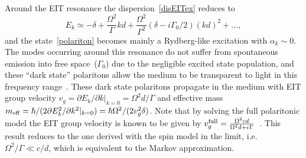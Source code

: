\documentclass[pra,twocolumn,showpacs,preprintnumbers,amsmath,amssymb]{revtex4-1}
\begin{document}
Around the EIT resonance the dispersion~\eqref{disEITex}  reduces to 
 \begin{equation}\label{disEIT}
E_k\simeq-\delta+\frac{\Omega^2}{\Gamma}kd+\frac{\Omega^2}{\Gamma^2}(\delta-i\Gamma_0/2) (kd)^2+...,
\end{equation}
and the state~\eqref{polariton} becomes mainly a Rydberg-like excitation 
with $\alpha_k\sim 0$.
The modes occurring around this resonance do not suffer from spontaneous emission into free space~($\Gamma_0$) due to the negligible excited state population, and these ``dark state'' polaritons allow the medium to be transparent to light in this frequency range~\cite{lukinEIT}. These dark state polaritons propagate in the medium with EIT group velocity $v_g=\partial E_k/\partial k|_{k=0}=\Omega^2d/\Gamma$ and effective mass $m_{\rm eff}=\hbar/(2\partial E^2_k/\partial k^2|_{k=0})=\hbar \Omega^2/(2 v_g^2\delta)$.
Note that  by solving the  full polaritonic model the EIT group velocity is known to be given by $v^{\rm full}_g=\frac{\Omega^2cd}{\Omega^2d+c\Gamma}$~\cite{lukinEIT}. This result reduces to the one  derived  with the spin model in the  limit, i.e. $\Omega^2/\Gamma\ll c/d$, which is equivalent to the Markov approximation.
\end{document}
